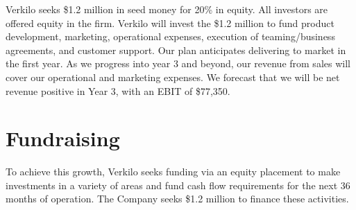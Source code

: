 \documentclass[11pt,openany]{book}
\begin{document}
Verkilo seeks \$1.2 million in seed money for 20\% in equity. All
investors are offered equity in the firm. Verkilo will invest the \$1.2
million to fund product development, marketing, operational expenses,
execution of teaming/business agreements, and customer support. Our plan
anticipates delivering to market in the first year. As we progress into
year 3 and beyond, our revenue from sales will cover our operational and
marketing expenses. We forecast that we will be net revenue positive in
Year 3, with an EBIT of \$77,350.

\hypertarget{fundraising}{%
\section{Fundraising}\label{fundraising}}

To achieve this growth, Verkilo seeks funding via an equity placement to
make investments in a variety of areas and fund cash flow requirements
for the next 36 months of operation. The Company seeks \$1.2 million to
finance these activities.
\end{document}
